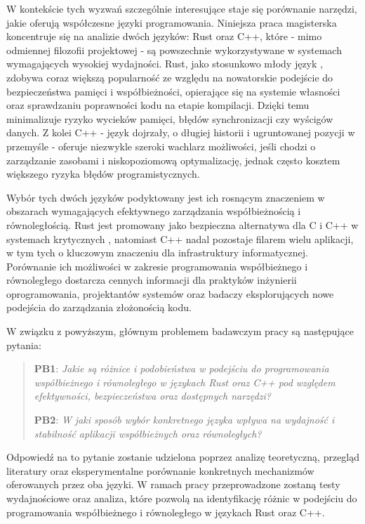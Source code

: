 W kontekście tych wyzwań szczególnie interesujące staje się porównanie narzędzi, jakie oferują współczesne języki programowania. Niniejsza praca magisterska koncentruje się na analizie dwóch języków: Rust oraz C++, które - mimo odmiennej filozofii projektowej - są powszechnie wykorzystywane w systemach wymagających wysokiej wydajności. Rust, jako stosunkowo młody język \cite{}, zdobywa coraz większą popularność\cite{} ze względu na nowatorskie podejście do bezpieczeństwa pamięci i współbieżności, opierające się na systemie własności  oraz sprawdzaniu poprawności kodu na etapie kompilacji. Dzięki temu minimalizuje ryzyko wycieków pamięci, błędów synchronizacji czy wyścigów danych. Z kolei C++ - język dojrzały, o długiej historii i ugruntowanej pozycji w przemyśle - oferuje niezwykle szeroki wachlarz możliwości, jeśli chodzi o zarządzanie zasobami i niskopoziomową optymalizację, jednak często kosztem większego ryzyka błędów programistycznych.

Wybór tych dwóch języków podyktowany jest ich rosnącym znaczeniem w obszarach wymagających efektywnego zarządzania współbieżnością i równoległością. Rust jest promowany jako bezpieczna alternatywa dla C i C++ w systemach krytycznych \cite{}, natomiast C++ nadal pozostaje filarem wielu aplikacji, w tym tych o kluczowym znaczeniu dla infrastruktury informatycznej. Porównanie ich możliwości w zakresie programowania współbieżnego i równoległego dostarcza cennych informacji dla praktyków inżynierii oprogramowania, projektantów systemów oraz badaczy eksplorujących nowe podejścia do zarządzania złożonością kodu.

W związku z powyższym, głównym problemem badawczym pracy są następujące pytania:
\begin{quote}
    \item \textbf{PB1}: 
    \emph{Jakie są różnice i podobieństwa w podejściu do programowania współbieżnego i równoległego w językach Rust oraz C++ pod względem efektywności, bezpieczeństwa oraz dostępnych narzędzi?}
    \item \textbf{PB2}:
    \emph{W jaki sposób wybór konkretnego języka wpływa na wydajność i stabilność aplikacji współbieżnych oraz równoległych?}
\end{quote}
Odpowiedź na to pytanie zostanie udzielona poprzez analizę teoretyczną, przegląd literatury oraz eksperymentalne porównanie konkretnych mechanizmów oferowanych przez oba języki. W ramach pracy przeprowadzone zostaną testy wydajnościowe oraz analiza, które pozwolą na identyfikację różnic w podejściu do programowania współbieżnego i równoległego w językach Rust oraz C++.

